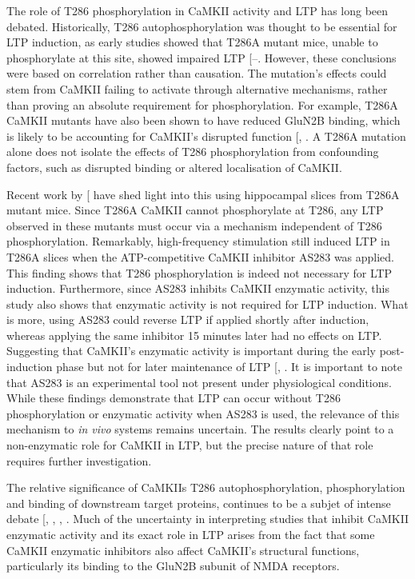 \documentclass[
  11pt,
  letterpaper,
]{scrreprt}
\begin{document}
The role of T286 phosphorylation in CaMKII activity and LTP has long
been debated. Historically, T286 autophosphorylation was thought to be
essential for LTP induction, as early studies showed that T286A mutant
mice, unable to phosphorylate at this site, showed impaired LTP
{[}--\citeproc{ref-vigil2016CaMKII}{209}{]}.
However, these conclusions were based on correlation rather than
causation. The mutation's effects could stem from CaMKII failing to
activate through alternative mechanisms, rather than proving an absolute
requirement for phosphorylation. For example, T286A CaMKII mutants have
also been shown to have reduced GluN2B binding, which is likely to be
accounting for CaMKII's disrupted function
{[},
\citeproc{ref-gustin2011Loss}{210}{]}. A T286A mutation alone does not
isolate the effects of T286 phosphorylation from confounding factors,
such as disrupted binding or altered localisation of CaMKII.

Recent work by {[}\citeproc{ref-rumian2024LTP}{211}{]} have shed light
into this using hippocampal slices from T286A mutant mice. Since T286A
CaMKII cannot phosphorylate at T286, any LTP observed in these mutants
must occur via a mechanism independent of T286 phosphorylation.
Remarkably, high-frequency stimulation still induced LTP in T286A slices
when the ATP-competitive CaMKII inhibitor AS283 was applied. This
finding shows that T286 phosphorylation is indeed not necessary for LTP
induction. Furthermore, since AS283 inhibits CaMKII enzymatic activity,
this study also shows that enzymatic activity is not required for LTP
induction. What is more, using AS283 could reverse LTP if applied
shortly after induction, whereas applying the same inhibitor 15 minutes
later had no effects on LTP. Suggesting that CaMKII's enzymatic activity
is important during the early post-induction phase but not for later
maintenance of LTP {[},
\citeproc{ref-rumian2024LTP}{211}{]}. It is important to note that AS283
is an experimental tool not present under physiological conditions.
While these findings demonstrate that LTP can occur without T286
phosphorylation or enzymatic activity when AS283 is used, the relevance
of this mechanism to \emph{in vivo} systems remains uncertain. The
results clearly point to a non-enzymatic role for CaMKII in LTP, but the
precise nature of that role requires further investigation.

The relative significance of CaMKIIs T286 autophosphorylation,
phosphorylation and binding of downstream target proteins, continues to
be a subjet of intense debate {[},
,
,
\citeproc{ref-cook2022CaMKIIb}{213}{]}. Much of the uncertainty in
interpreting studies that inhibit CaMKII enzymatic activity and its
exact role in LTP arises from the fact that some CaMKII enzymatic
inhibitors also affect CaMKII's structural functions, particularly its
binding to the GluN2B subunit of NMDA receptors.
\end{document}
